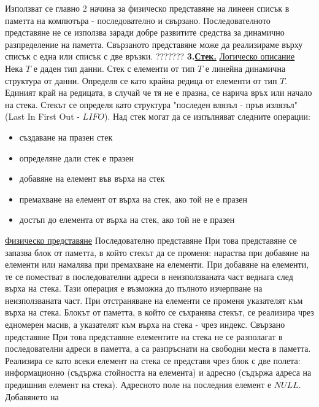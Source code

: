 \documentclass{article}
\begin{document}
Използват се главно 2 начина за физическо представяне на линеен списък в паметта на компютъра - последователно и свързано.
Последователното представяне не се използва заради добре развитите средства за динамично разпределение на паметта. Свързаното
представяне може да реализираме върху списък с една или списък с две връзки. ???????\newline
\textbf{3.\underline{Стек.}} \newline\newline
\underline{Логическо описание} \newline
Нека $T$ е даден тип данни. Стек с елементи от тип $T$ е линейна динамична структура от данни. Определя се като крайна редица от
елементи от тип $T$. Единият край на редицата, в случай че тя не е празна, се нарича връх или начало на стека. Стекът се определя
като структура "последен влязъл - пръв излязъл" (Last In First Out - $LIFO$). Над стек могат да се изпълняват следните операции:
\begin{itemize}
    \item създаване на празен стек
    \item определяне дали стек е празен
    \item добавяне на елемент във върха на стек
    \item премахване на елемент от върха на стек, ако той не е празен
    \item достъп до елемента от върха на стек, ако той не е празен
\end{itemize}
\underline{Физическо представяне} \newline
Последователно представяне
При това представяне се запазва блок от паметта, в който стекът да се променя: нараства при добавяне на елементи или намалява
при премахване на елементи. При добавяне на елементи, те се поместват в последователни адреси в неизползваната част веднага след
върха на стека. Тази операция е възможна до пълното изчерпване на неизползваната част. При отстраняване на елементи се променя
указателят към върха на стека. Блокът от паметта, в който се съхранява стекът, се реализира чрез едномерен масив, а указателят
към върха на стека - чрез индекс.
Свързано представяне
При това представяне елементите на стека не се разполагат в последователни адреси в паметта, а са разпръснати на свободни места
в паметта. Реализира се като всеки елемент на стека се представя чрез блок с две полета: информационно (съдържа стойността на
елемента) и адресно (съдържа адреса на предишния елемент на стека). Адресното поле на последния елемент е $NULL$. Добавянето на
\end{document}

